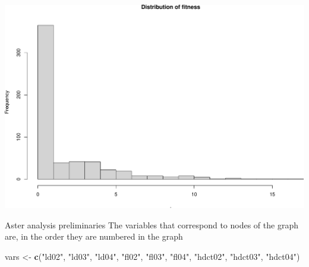 \documentclass[
  ignorenonframetext,
]{beamer}
\newenvironment{Shaded}{\begin{snugshade}}{\end{snugshade}}
\newcommand{\AttributeTok}[1]{\textcolor[rgb]{0.13,0.29,0.53}{#1}}
\newcommand{\DecValTok}[1]{\textcolor[rgb]{0.00,0.00,0.81}{#1}}
\newcommand{\FunctionTok}[1]{\textcolor[rgb]{0.13,0.29,0.53}{\textbf{#1}}}
\newcommand{\NormalTok}[1]{#1}
\newcommand{\OtherTok}[1]{\textcolor[rgb]{0.56,0.35,0.01}{#1}}
\newcommand{\SpecialCharTok}[1]{\textcolor[rgb]{0.81,0.36,0.00}{\textbf{#1}}}
\newcommand{\StringTok}[1]{\textcolor[rgb]{0.31,0.60,0.02}{#1}}
\begin{document}
\begin{frame}[fragile]{}
\protect\hypertarget{section-8}{}
\tiny

\begin{Shaded}
\end{Shaded}

\includegraphics{week14p2_files/figure-beamer/unnamed-chunk-9-1.pdf}
\end{frame}

\begin{frame}[fragile]{Aster analysis preliminaries}
\protect\hypertarget{aster-analysis-preliminaries}{}
The variables that correspond to nodes of the graph are, in the order
they are numbered in the graph \vspace{12pt}

\begin{Shaded}
\begin{Highlighting}[]
\NormalTok{vars }\OtherTok{\textless{}{-}} \FunctionTok{c}\NormalTok{(}\StringTok{"ld02"}\NormalTok{, }\StringTok{"ld03"}\NormalTok{, }\StringTok{"ld04"}\NormalTok{, }\StringTok{"fl02"}\NormalTok{, }\StringTok{"fl03"}\NormalTok{, }
                    \StringTok{"fl04"}\NormalTok{, }\StringTok{"hdct02"}\NormalTok{, }\StringTok{"hdct03"}\NormalTok{, }\StringTok{"hdct04"}\NormalTok{)}
\end{Highlighting}
\end{Shaded}
\end{frame}
\end{document}

